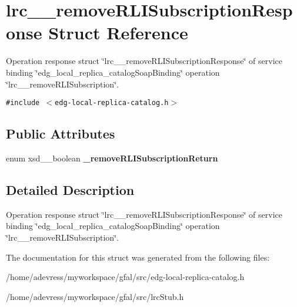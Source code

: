 \section{lrc\_\-\_\-remove\-RLISubscription\-Response Struct Reference}
\label{structlrc____removeRLISubscriptionResponse}
Operation response struct \char`\"{}lrc\_\-\_\-remove\-RLISubscription\-Response\char`\"{} of service binding \char`\"{}edg\_\-local\_\-replica\_\-catalog\-Soap\-Binding\char`\"{} operation \char`\"{}lrc\_\-\_\-remove\-RLISubscription\char`\"{}.  


{\tt \#include $<$edg-local-replica-catalog.h$>$}

\subsection*{Public Attributes}
\begin{CompactItemize}
\item 
enum xsd\_\-\_\-boolean \textbf{\_\-remove\-RLISubscription\-Return}\label{structlrc____removeRLISubscriptionResponse_2ecced25e01a2a66ac62d7a8bd77b47c}

\end{CompactItemize}


\subsection{Detailed Description}
Operation response struct \char`\"{}lrc\_\-\_\-remove\-RLISubscription\-Response\char`\"{} of service binding \char`\"{}edg\_\-local\_\-replica\_\-catalog\-Soap\-Binding\char`\"{} operation \char`\"{}lrc\_\-\_\-remove\-RLISubscription\char`\"{}. 



The documentation for this struct was generated from the following files:\begin{CompactItemize}
\item 
/home/adevress/myworkspace/gfal/src/edg-local-replica-catalog.h\item 
/home/adevress/myworkspace/gfal/src/lrc\-Stub.h\end{CompactItemize}
